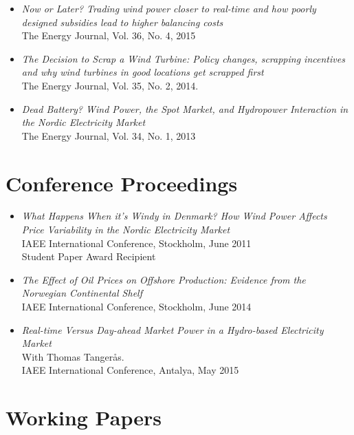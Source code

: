 \documentclass[margin]{res}
\begin{document}
\begin{resume}
\begin{itemize}
\item[] \emph{Now or Later? Trading wind power closer to real-time and how poorly designed subsidies lead to higher balancing costs}\\
The Energy Journal, Vol. 36, No. 4, 2015 

\item[] \emph{The Decision to Scrap a Wind Turbine: Policy changes, scrapping incentives and why wind turbines in good locations get scrapped first}\\
The Energy Journal, Vol. 35, No. 2, 2014.

\item[] \emph{Dead Battery? Wind Power, the Spot Market, and Hydropower Interaction in the Nordic Electricity Market}\\
The Energy Journal, Vol. 34, No. 1, 2013
\end{itemize}

\normalsize{\section{Conference Proceedings}}
\begin{itemize}  
\setlength{\itemsep}{10pt}
\item[] \emph{What Happens When it's Windy in Denmark? How Wind Power Affects Price Variability in the Nordic Electricity Market}\\ 
IAEE International Conference, Stockholm, June 2011  \\
Student Paper Award Recipient 

\item[] \emph{The Effect of Oil Prices on Offshore Production: Evidence from the Norwegian Continental Shelf}\\
IAEE International Conference, Stockholm, June 2014  \\

\item[] \emph{Real-time Versus Day-ahead Market Power in a Hydro-based Electricity Market} \\ 
With Thomas Tanger\aa s. \\
IAEE International Conference, Antalya, May 2015
\end{itemize}

\normalsize{\section{Working Papers}}
\begin{itemize}  
\setlength{\itemsep}{10pt}


\end{itemize}
\end{resume}
\end{document}
